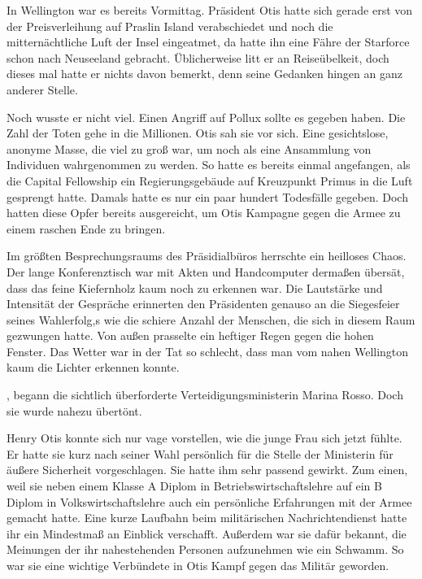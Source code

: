 In Wellington war es bereits Vormittag. Präsident Otis hatte sich gerade erst von der Preisverleihung auf Praslin Island verabschiedet und noch die mitternächtliche Luft der Insel eingeatmet, da hatte ihn eine Fähre der Starforce schon nach Neuseeland gebracht. Üblicherweise litt er an Reiseübelkeit, doch dieses mal hatte er nichts davon bemerkt, denn seine Gedanken hingen an ganz anderer Stelle.

\par

Noch wusste er nicht viel. Einen Angriff auf Pollux sollte es gegeben haben. Die Zahl der Toten gehe in die Millionen. Otis sah sie vor sich. Eine gesichtslose, anonyme Masse, die viel zu groß war, um noch als eine Ansammlung von Individuen wahrgenommen zu werden. So hatte es bereits einmal angefangen, als die Capital Fellowship ein Regierungsgebäude auf Kreuzpunkt Primus in die Luft gesprengt hatte. Damals hatte es nur ein paar hundert Todesfälle gegeben. Doch hatten diese Opfer bereits ausgereicht, um Otis Kampagne gegen die Armee zu einem raschen Ende zu bringen.

\par

Im größten Besprechungsraums des Präsidialbüros herrschte ein heilloses Chaos. Der lange Konferenztisch war mit Akten und Handcomputer dermaßen übersät, dass das feine Kiefernholz  kaum noch zu erkennen war. Die Lautstärke und Intensität der Gespräche erinnerten den Präsidenten genauso an die Siegesfeier seines Wahlerfolg,s wie die schiere Anzahl der Menschen, die sich in diesem Raum gezwungen hatte. Von außen prasselte ein heftiger Regen gegen die hohen Fenster. Das Wetter war in der Tat so schlecht, dass man vom nahen Wellington kaum die Lichter erkennen konnte.

\par

, begann die sichtlich überforderte Verteidigungsministerin Marina Rosso. Doch sie wurde nahezu übertönt.

\par

Henry Otis konnte sich nur vage vorstellen, wie die junge Frau sich jetzt fühlte. Er hatte sie kurz nach seiner Wahl persönlich für die Stelle der Ministerin für äußere Sicherheit vorgeschlagen. Sie hatte ihm sehr passend gewirkt. Zum einen, weil sie neben einem Klasse A Diplom in Betriebswirtschaftslehre auf ein B Diplom in Volkswirtschaftslehre auch ein persönliche Erfahrungen mit der Armee gemacht hatte. Eine kurze Laufbahn beim militärischen Nachrichtendienst hatte ihr ein Mindestmaß an Einblick verschafft. Außerdem war sie dafür bekannt, die Meinungen der ihr nahestehenden Personen aufzunehmen wie ein Schwamm. So war sie eine wichtige Verbündete in Otis Kampf gegen das Militär geworden.

